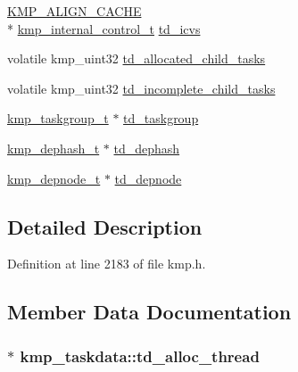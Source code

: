\begin{DoxyCompactItemize}
\item 
\hyperlink{kmp__os_8h_a6830c178a3906c25cd0138d8365db070}{K\-M\-P\-\_\-\-A\-L\-I\-G\-N\-\_\-\-C\-A\-C\-H\-E} \\*
\hyperlink{kmp_8h_aeee976c9503b72fe3e38d18d88b305cf}{kmp\-\_\-internal\-\_\-control\-\_\-t} \hyperlink{structkmp__taskdata_abcb9336b26be5ded3ee98a71c1ce3762}{td\-\_\-icvs}
\item 
volatile kmp\-\_\-uint32 \hyperlink{structkmp__taskdata_a56dce087baa8fa613d288f54e5e26bdb}{td\-\_\-allocated\-\_\-child\-\_\-tasks}
\item 
volatile kmp\-\_\-uint32 \hyperlink{structkmp__taskdata_af2d9a1116312e78182a768bb19bc5021}{td\-\_\-incomplete\-\_\-child\-\_\-tasks}
\item 
\hyperlink{kmp_8h_a05ce4b806decc7f74cf428b194a73aae}{kmp\-\_\-taskgroup\-\_\-t} $\ast$ \hyperlink{structkmp__taskdata_a568185a9e8c23a1682491fa55973d61c}{td\-\_\-taskgroup}
\item 
\hyperlink{kmp_8h_a29db3e0a660b708279b843cd5c1b7d2d}{kmp\-\_\-dephash\-\_\-t} $\ast$ \hyperlink{structkmp__taskdata_a428a82593aa88b9d2420390cdee239d8}{td\-\_\-dephash}
\item 
\hyperlink{kmp_8h_a5197537dbef055a1d52ecdcbf5578098}{kmp\-\_\-depnode\-\_\-t} $\ast$ \hyperlink{structkmp__taskdata_a877878bd557ba3bdc7749e531cb845b3}{td\-\_\-depnode}
\end{DoxyCompactItemize}


\subsection{Detailed Description}


Definition at line 2183 of file kmp.\-h.



\subsection{Member Data Documentation}
\hypertarget{structkmp__taskdata_a7b8d9a186786bc69e6883d4120553c10}{
\subsubsection[{td\-\_\-alloc\-\_\-thread}]{$\ast$ kmp\-\_\-taskdata\-::td\-\_\-alloc\-\_\-thread}}\label{structkmp__taskdata_a7b8d9a186786bc69e6883d4120553c10}


